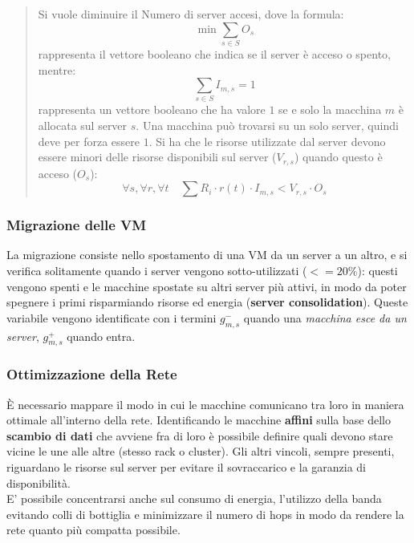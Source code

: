 \documentclass{article}
\begin{document}
		\begin{quote}
		Si vuole diminuire il Numero di server accesi, dove la formula: \[
		\min{\sum_{s\in S}} O_s
		\] rappresenta il vettore booleano che indica se il server è
		acceso o spento, mentre: \[
		\sum_{s \in S}I_{m,s} = 1
		\] rappresenta un vettore booleano che ha valore \(1\) se
		e solo la macchina \(m\) è allocata sul server \(s\). Una
		macchina può trovarsi su un solo server, quindi deve per forza essere
		\(1\). Si ha che le risorse utilizzate dal server devono essere minori
		delle risorse disponibili sul server (\(V_{r,s}\)) quando questo è
		acceso (\(O_s\)): \[
		\forall s, \forall r, \forall t \quad \sum R_i \cdot r(t) \cdot I_{m,s} < V_{r,s} \cdot O_s
		\]
		\end{quote}

		\subsubsection{Migrazione delle VM}\label{migrazione-delle-vm}
		
		La migrazione consiste nello spostamento di una
		VM da un server a un altro, e si verifica solitamente quando i server
		vengono sotto-utilizzati ($<=20\%$): questi vengono spenti e le macchine spostate
		su altri server più attivi, in modo da poter spegnere i primi
		risparmiando risorse ed energia (\textbf{server consolidation}). Queste variabile vengono identificate
		con i termini \(g_{m,s}^{-}\) quando una \emph{macchina esce da un
		server}, \(g_{m,s}^{+}\) quando entra.
		
		\subsubsection{Ottimizzazione della Rete}\label{ottimizzazione-della-rete}
		
		È necessario mappare il modo in cui le macchine comunicano tra loro in
		maniera ottimale all'interno della rete. Identificando le macchine \textbf{affini} sulla base dello \textbf{scambio di dati} che avviene fra di loro è possibile definire quali devono stare vicine le une alle altre (stesso rack o cluster). Gli altri vincoli, sempre presenti, riguardano le risorse sul server per evitare il sovraccarico e la garanzia di disponibilità.\\
		E' possibile concentrarsi anche sul consumo di energia, l'utilizzo della banda evitando colli di bottiglia e minimizzare il numero di hops in modo da rendere la rete quanto più compatta possibile.
		
\end{document}

